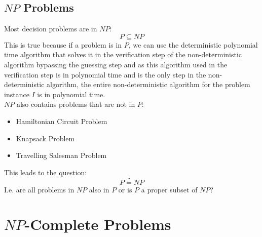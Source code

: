\documentclass[12pt letter]{report}
\begin{document}
\subsection{ $NP$ Problems}

Most decision problems are in $NP$:
\[
  P \subseteq NP
\]
This is true because if a problem is in $P$, we can use the deterministic polynomial time algorithm that solves it in
the verification step of the non-deterministic algorithm bypassing the guessing step and as this algorithm used in the
verification step is in polynomial time and is the only step in the non-deterministic algorithm, the entire
non-deterministic algorithm for the problem instance $I$ is in polynomial time. \\

$N P$ also contains problems that are not in $P$:
\begin{itemize}
  \item Hamiltonian Circuit Problem
  \item Knapsack Problem
  \item Travelling Salesman Problem
\end{itemize}

This leads to the question:
\[
  P \stackrel{?}{=} NP
\]
I.e. are all problems in $N P$ also in $P$ or is $P$ a proper subset of $NP$?

\section{ $N P$-Complete Problems}


\end{document}
